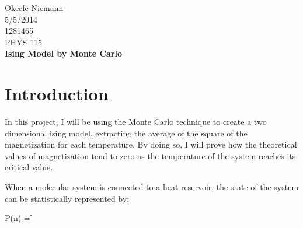 \documentclass[10pt]{article}
\begin{document}
 
\begin{center}
\large
\hfill Okeefe Niemann\\
\hfill 5/5/2014\\
\hfill 1281465\\
\hfill PHYS 115 \\
\LARGE \textbf{Ising Model by Monte Carlo}\\
\end{center}
\normalsize
\section{Introduction}
In this project, I will be using the Monte Carlo technique to create a two dimensional ising model, extracting the average of the square of the magnetization for each temperature. By doing so, I will prove how the theoretical values of magnetization tend to zero as the temperature of the system reaches its critical value.

When a molecular system is connected to a heat reservoir, the state of the system can be statistically represented by:

$$P(n) = \f
\end{document}
